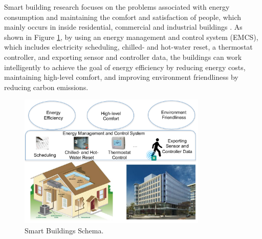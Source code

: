 Smart building research focuses on the problems associated with energy consumption and maintaining the comfort and satisfaction of people, 
which mainly occurs in inside residential, 
commercial and industrial buildings \cite{hatley2005energy}. 
As shown in Figure \ref{fig_smartbuilding}, 
by using an energy management and control system (EMCS), 
which includes electricity scheduling, 
chilled- and hot-water reset, a thermostat controller, 
and exporting sensor and controller data, 
the buildings can work intelligently to 
achieve the goal of energy efficiency by reducing energy costs, 
maintaining high-level comfort, 
and improving environment friendliness by reducing carbon emissions.
\begin{figure}[h]
\centering
\includegraphics[width=0.8\textwidth]{fig/smartbuilding.pdf}
\caption{Smart Buildings Schema.\label{fig_smartbuilding}}
\end{figure}


